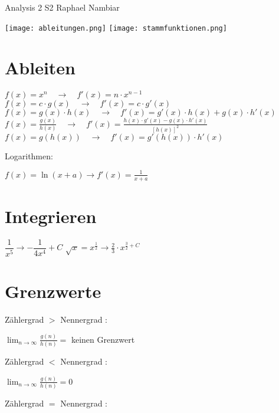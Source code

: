 



\begin{multicols*}{3}

    \DocumentInfo
    {Analysis 2 S2} %
    {Raphael Nambiar} %





    \texttt{[image: ableitungen.png]}
    \texttt{[image: stammfunktionen.png]}

    \section{ Ableiten }

    $f(x) = x^n \quad \rightarrow \quad f'(x) = n \cdot x^{n-1}$
    \WhiteSpace
    $f(x) = c \cdot g(x) \quad \rightarrow \quad f'(x) = c \cdot g'(x)$
    \WhiteSpace
    $f(x) = g(x) \cdot h(x) \quad \rightarrow \quad f'(x) = g'(x) \cdot h(x) + g(x) \cdot h'(x)$
    \WhiteSpace
    $f(x) = \frac{g(x)}{h(x)} \quad \rightarrow \quad f'(x)=\frac{h(x) \cdot g'(x) - g(x) \cdot h'(x)}{\left[h(x)\right]^2}$
    \WhiteSpace
    $f(x) = g(h(x)) \quad \rightarrow \quad f'(x) = g'(h(x)) \cdot h'(x)$
    \WhiteSpace

    {Logarithmen:}

    {$f(x) = \ln(x+a) \to f'(x) = \frac{1}{x+a}$}
    \WhiteSpace
    \section{ Integrieren }
    \WhiteSpace
    {$\dfrac{1}{x^5} \rightarrow -\dfrac{1}{4x^4} + C$}
    \WhiteSpace
    \WhiteSpace
    {$\sqrt{x} = x^{\frac{1}{2}} \rightarrow \frac{2}{3}\cdot x^{\frac{3}{2} + C} $}
    \WhiteSpace
    \WhiteSpace
    \vfill\null
    \columnbreak
    \section{Grenzwerte}
    \WhiteSpace
    {Zählergrad $>$ Nennergrad : }

    {\large $ \lim_{n\to \infty} \frac{g(n)}{h(n)} = $ keinen Grenzwert}
    \WhiteSpace

    {Zählergrad $<$ Nennergrad : }

    { \large $ \lim_{n\to \infty} \frac{g(n)}{h(n)} = 0$}
    \WhiteSpace

    {Zählergrad $=$ Nennergrad : }


\end{multicols*}
